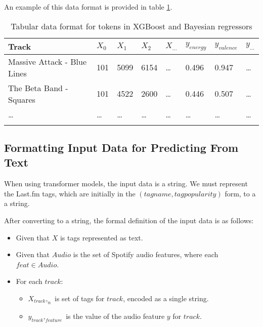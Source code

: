 \documentclass[sn-mathphys]{sn-jnl}%
\theoremstyle{thmstyleone}%
\theoremstyle{thmstyletwo}%
\theoremstyle{thmstylethree}%
\begin{document}
An example of this data format is provided in table \ref{tabular_token_format}.

\begin{table}[h]
      \begin{center}
      \begin{minipage}{\textwidth}
      \caption{Tabular data format for tokens in XGBoost and Bayesian regressors}\label{tabular_token_format}%
      \begin{tabular}{@{}llllllll@{}}
      \toprule
      Track                         & $X_{0}$ & $X_{1}$ & $X_{2}$ & $X_{\dots}$ & $y_{energy}$ & $y_{valence}$ & $y_{\dots}$ \\
      \midrule
      Massive Attack - Blue Lines   & 101     & 5099    & 6154    &  \dots      & 0.496        & 0.947         &  \dots  \\
      The Beta Band - Squares       & 101     & 4522    & 2600    &  \dots      & 0.446        & 0.507         &  \dots  \\
      \dots                         & \dots   & \dots   & \dots   &  \dots      & \dots        & \dots         &  \dots  \\
      \botrule
      \end{tabular}
      \end{minipage}
      \end{center}
\end{table}


\subsection{Formatting Input Data for Predicting From Text}

When using transformer models, the input data is a string.
We must represent the Last.fm tags, which are initially in the $(tag name, tag popularity)$ form, to a a string.

After converting to a string, the formal definition of the input data is as follows:

\begin{itemize}
      \item Given that $X$ is tags represented as text.
      \item Given that $Audio$ is the set of Spotify audio features, where each $feat \in Audio$.
      \item For each $track$:
      \begin{itemize}
            \item $X_{track},_{n}$ is set of tags for $track$, encoded as a single string.
            \item $y_{track},_{feature}$ is the value of the audio feature $y$ for $track$.
      \end{itemize}
\end{itemize}
\end{document}
